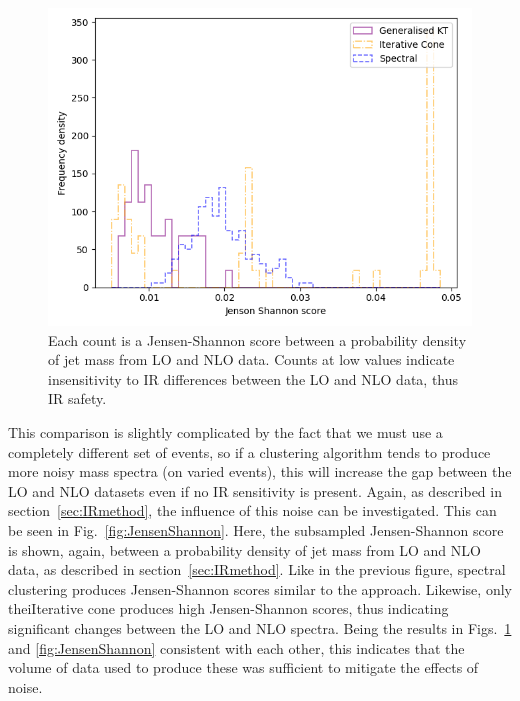 \begin{figure}[htp]
    \begin{minipage}[c]{0.6\textwidth}
    \includegraphics[width=1.\textwidth]{graphics/JensenShannon_unnormed.png}
    \end{minipage}\hfill
    \begin{minipage}[c]{0.35\textwidth}
    \caption{
        Each count is a  Jensen-Shannon score between a probability density of jet mass from LO and
        NLO data.
        Counts at low values indicate insensitivity to IR differences between the LO and NLO data,
        thus IR safety.
     }\label{fig:unnormedJS}
    \end{minipage}
\end{figure}    

This comparison is slightly complicated by the fact that we must use a completely different set of events,
so if a clustering algorithm tends to produce more noisy mass spectra (on varied events), this
 will increase the gap between the LO and NLO datasets even if no IR sensitivity is present.
Again, as described in section~\ref{sec:IRmethod}, the influence of this noise can be investigated.
This can be seen in Fig.~\ref{fig:JensenShannon}. Here, 
the subsampled Jensen-Shannon score is shown, again,  between a probability density of jet mass from LO and
        NLO data, as described in section~\ref{sec:IRmethod}. Like in the previous figure, spectral clustering produces Jensen-Shannon scores similar to the \genkt{} approach. Likewise, only theiIterative cone produces high Jensen-Shannon scores, thus indicating significant changes
        between the LO and NLO spectra. Being the results in  Figs.~\ref{fig:unnormedJS} and \ref{fig:JensenShannon} consistent with each other, this indicates  that the volume of data used to produce these
        was sufficient to mitigate the effects of noise.

